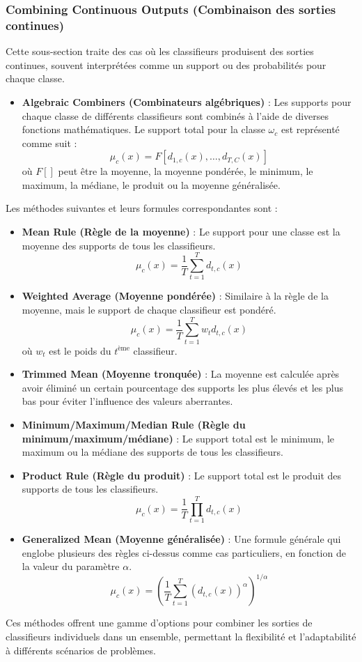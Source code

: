 \subsubsection*{Combining Continuous Outputs (Combinaison des sorties continues)}

Cette sous-section traite des cas où les classifieurs produisent des sorties continues, souvent interprétées comme un support ou des probabilités pour chaque classe.

\begin{itemize}
	\item \textbf{Algebraic Combiners (Combinateurs algébriques)} : Les supports pour chaque classe de différents classifieurs sont combinés à l'aide de diverses fonctions mathématiques. Le support total pour la classe $\omega_c$ est représenté comme suit :
	\[
	\mu_c(x) = F [d_{1,c}(x), \ldots, d_{T,C}(x)]
	\]
	où $F[]$ peut être la moyenne, la moyenne pondérée, le minimum, le maximum, la médiane, le produit ou la moyenne généralisée.
\end{itemize}
Les méthodes suivantes et leurs formules correspondantes sont :

\begin{itemize}
	\item \textbf{Mean Rule (Règle de la moyenne)} : Le support pour une classe est la moyenne des supports de tous les classifieurs.
	\[
	\mu_c(x) = \frac{1}{T} \sum_{t=1}^{T} d_{t,c}(x)
	\]
	
	\item \textbf{Weighted Average (Moyenne pondérée)} : Similaire à la règle de la moyenne, mais le support de chaque classifieur est pondéré.
	\[
	\mu_c(x) = \frac{1}{T} \sum_{t=1}^{T} w_t d_{t,c}(x)
	\]
	où $w_t$ est le poids du $t^{\text{ème}}$ classifieur.
	
	\item \textbf{Trimmed Mean (Moyenne tronquée)} : La moyenne est calculée après avoir éliminé un certain pourcentage des supports les plus élevés et les plus bas pour éviter l'influence des valeurs aberrantes.
	
	\item \textbf{Minimum/Maximum/Median Rule (Règle du minimum/maximum/médiane)} : Le support total est le minimum, le maximum ou la médiane des supports de tous les classifieurs.
	
	\item \textbf{Product Rule (Règle du produit)} : Le support total est le produit des supports de tous les classifieurs.
	\[
	\mu_c(x) = \frac{1}{T} \prod_{t=1}^{T} d_{t,c}(x)
	\]
	
	\item \textbf{Generalized Mean (Moyenne généralisée)} : Une formule générale qui englobe plusieurs des règles ci-dessus comme cas particuliers, en fonction de la valeur du paramètre $\alpha$.
	\[
	\mu_c(x) = \left( \frac{1}{T} \sum_{t=1}^{T} (d_{t,c}(x))^\alpha \right)^{1/\alpha}
	\]
\end{itemize}
Ces méthodes offrent une gamme d'options pour combiner les sorties de classifieurs individuels dans un ensemble, permettant la flexibilité et l'adaptabilité à différents scénarios de problèmes.

